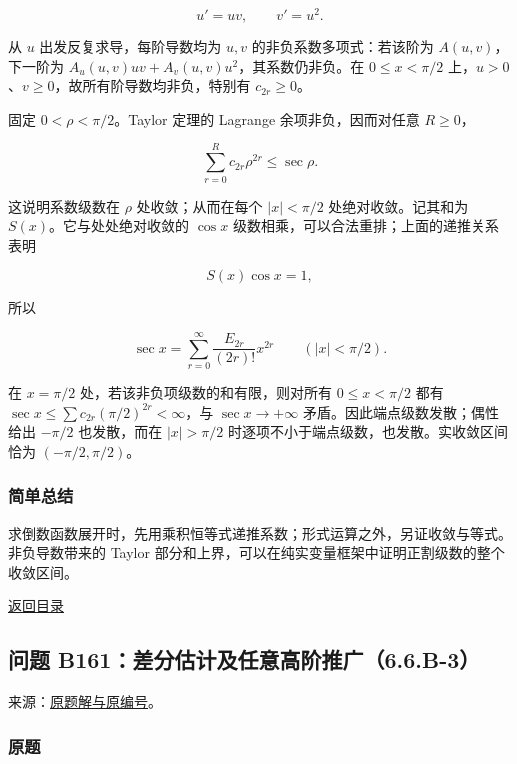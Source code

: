 \documentclass[11pt,a4paper]{article}
\begin{document}
\[
u'=uv,\qquad v'=u^2.
\]

从 \(u\) 出发反复求导，每阶导数均为 \(u,v\) 的非负系数多项式：若该阶为
\(A(u,v)\)，下一阶为 \(A_u(u,v)uv+A_v(u,v)u^2\)，其系数仍非负。在
\(0\le x<\pi/2\) 上，\(u>0\)、\(v\ge0\)，故所有阶导数均非负，特别有
\(c_{2r}\ge0\)。

固定 \(0<\rho<\pi/2\)。Taylor 定理的 Lagrange 余项非负，因而对任意
\(R\ge0\)，

\[
\sum_{r=0}^{R}c_{2r}\rho^{2r}\le\sec\rho.
\]

这说明系数级数在 \(\rho\) 处收敛；从而在每个 \(|x|<\pi/2\)
处绝对收敛。记其和为 \(S(x)\)。它与处处绝对收敛的 \(\cos x\)
级数相乘，可以合法重排；上面的递推关系表明

\[
S(x)\cos x=1,
\]

所以

\[
\sec x=\sum_{r=0}^{\infty}\frac{E_{2r}}{(2r)!}x^{2r}
\qquad(|x|<\pi/2).
\]

在 \(x=\pi/2\) 处，若该非负项级数的和有限，则对所有 \(0\le x<\pi/2\)
都有 \(\sec x\le\sum c_{2r}(\pi/2)^{2r}<\infty\)，与
\(\sec x\to+\infty\) 矛盾。因此端点级数发散；偶性给出 \(-\pi/2\)
也发散，而在 \(|x|>\pi/2\) 时逐项不小于端点级数，也发散。实收敛区间恰为
\((-\pi/2,\pi/2)\)。

\subsubsection{简单总结}\label{ux7b80ux5355ux603bux7ed3-25}

求倒数函数展开时，先用乘积恒等式递推系数；形式运算之外，另证收敛与等式。非负导数带来的
Taylor 部分和上界，可以在纯实变量框架中证明正割级数的整个收敛区间。

\noindent\hyperref[contents]{返回目录}

\subsection{问题
B161：差分估计及任意高阶推广（6.6.B-3）}\label{ux95eeux9898-b161ux5deeux5206ux4f30ux8ba1ux53caux4efbux610fux9ad8ux9636ux63a8ux5e7f6.6.b-3}

来源：\href{https://zj139.github.io/math-notes/problems/07a9f1208dd119dd666e6278/\#问题-b161}{原题解与原编号}。

\subsubsection{原题}\label{ux539fux9898-26}
\end{document}
